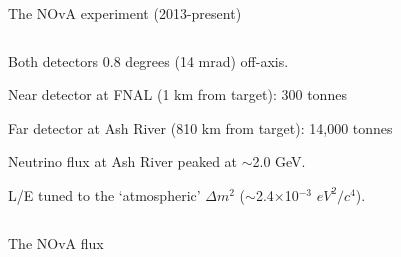 \begin{frame}{The NOvA experiment (2013-present)}
\begin{columns}
\begin{column}{0.55\textwidth}
\begin{itemize}
{    \item Both detectors 0.8 degrees (14 mrad) off-axis.
    \item Near detector at FNAL (1 km from target): 300 tonnes
    \item Far detector at Ash River (810 km from target): 14,000 tonnes
    \item Neutrino flux at Ash River peaked at $\sim$2.0 GeV.
    \item L/E tuned to the `atmospheric' ${\Delta}m^{2}$ ($\sim$2.4$\times$10$^{-3}$ $eV^{2}/c^{4}$).
  }
  \end{itemize}
  \end{column}
\end{columns}
\end{frame}

%
%
%

\begin{frame}{The NOvA flux}


\end{frame}
